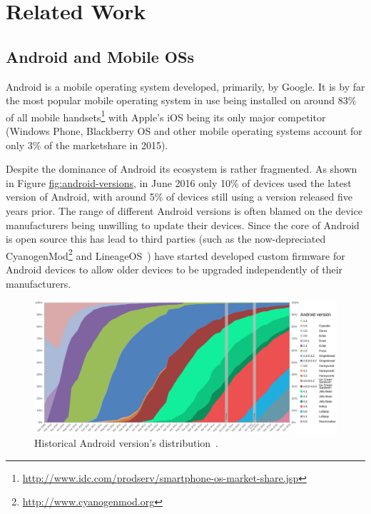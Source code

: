 \documentclass[thesis.tex]{subfiles}
\begin{document}
\chapter{Related Work}
\label{chap:related-work}

\section{Android and Mobile OSs}\label{android}

Android is a mobile operating system developed, primarily, by Google. It is by
far the most popular mobile operating system in use being installed on around
83\% of all mobile
handsets\footnote{\url{http://www.idc.com/prodserv/smartphone-os-market-share.jsp}}
with Apple's iOS being its only major competitor (Windows Phone, Blackberry OS
and other mobile operating systems account for only 3\% of the marketshare in
2015).

Despite the dominance of Android its ecosystem is rather fragmented. As shown in
Figure \url{fig:android-versions}, in June 2016 only 10\% of devices used the
latest version of Android, with around 5\% of devices still using a version
released five years prior. The range of different Android versions is often
blamed on the device manufacturers being unwilling to update their devices.
Since the core of Android is open source this has lead to third parties (such as the now-depreciated
CyanogenMod\footnote{\url{http://www.cyanogenmod.org}} and LineageOS~\cite{lineageos_lineageos_2017}) have started developed
custom firmware for Android devices to allow older devices to be upgraded
independently of their manufacturers.

\begin{figure}
\centering
\includegraphics[width=\linewidth]{figures/android-versions.pdf}
\caption[Historical Android version's distribution.]{Historical Android
  version's distribution~\cite{erikrespo_android_2017}.}
\end{figure}
\end{document}
